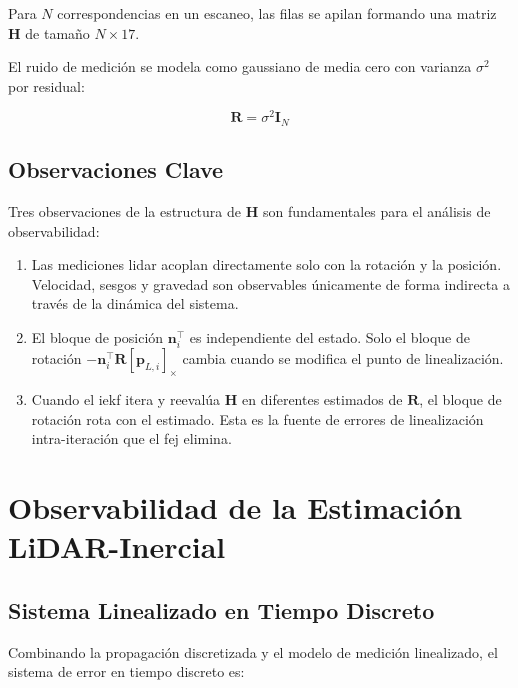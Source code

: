 Para $N$ correspondencias en un escaneo, las filas se apilan formando una matriz
$\mathbf{H}$ de tamaño $N \times 17$.

El ruido de medición se modela como gaussiano de media cero con varianza
$\sigma^2$ por residual:

\begin{equation}
\mathbf{R} = \sigma^2 \mathbf{I}_N
\label{eq:meas-noise}
\end{equation}

\subsection{Observaciones Clave}
\label{sec:fej-observaciones-h}

Tres observaciones de la estructura de $\mathbf{H}$ son fundamentales para el
análisis de observabilidad:

\begin{enumerate}
    \item Las mediciones \gls{lidar} acoplan directamente solo con la rotación
    y la posición. Velocidad, sesgos y gravedad son observables únicamente de
    forma indirecta a través de la dinámica del sistema.
    \item El bloque de posición $\mathbf{n}_i^\top$ es independiente del estado.
    Solo el bloque de rotación $-\mathbf{n}_i^\top \mathbf{R} [\mathbf{p}_{L,i}]_\times$
    cambia cuando se modifica el punto de linealización.
    \item Cuando el \gls{iekf} itera y reevalúa $\mathbf{H}$ en diferentes
    estimados de $\mathbf{R}$, el bloque de rotación rota con el estimado. Esta
    es la fuente de errores de linealización intra-iteración que el \gls{fej}
    elimina.
\end{enumerate}

\section{Observabilidad de la Estimación LiDAR-Inercial}
\label{sec:fej-observabilidad}

\subsection{Sistema Linealizado en Tiempo Discreto}
\label{sec:fej-sistema-discreto}

Combinando la propagación discretizada y el modelo de medición linealizado, el
sistema de error en tiempo discreto es:

